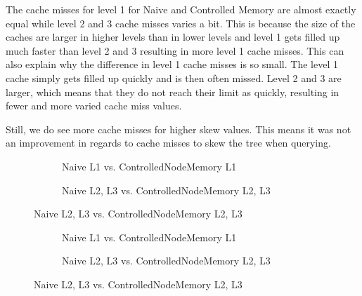 The cache misses for level 1 for Naive and Controlled Memory are almost exactly equal while level 2 and 3 cache misses varies a bit.
This is because the size of the caches are larger in higher levels than in lower levels and level 1 gets filled up much faster than level 2 and 3 resulting in more level 1 cache misses.
This can also explain why the difference in level 1 cache misses is so small. 
The level 1 cache simply gets filled up quickly and is then often missed. Level 2 and 3 are larger, which means that they do not reach their limit as quickly, resulting in fewer and more varied cache miss values.

Still, we do see more cache misses for higher skew values.
This means it was not an improvement in regards to cache misses to skew the tree when querying.

\begin{figure}
\caption{Rank Cache Misses on Wavelet Tree with increasing skew}
\label{fig:NaiveControlledNodeMemoryRankSkewCacheMisses}
\centering
\begin{subfigure}{\textwidth}
	\caption{Naive L1 vs. ControlledNodeMemory L1}
	\label{fig:L1NaiveControlledNodeMemoryRankSkewCacheMisses}
	
	\vspace*{5 mm}
\end{subfigure}
\begin{subfigure}{\textwidth}
	\caption{Naive L2, L3 vs. ControlledNodeMemory L2, L3}
	\label{fig:L2L3NaiveControlledNodeMemoryRankSkewCacheMisses}
 	
\end{subfigure}
\end{figure}

\begin{figure}
\caption{Select Cache Misses on Wavelet Tree with increasing skew}
\label{fig:NaiveControlledNodeMemorySelectSkewCacheMisses}
\centering
\begin{subfigure}{\textwidth}
	\caption{Naive L1 vs. ControlledNodeMemory L1}
	\label{fig:L1NaiveControlledNodeMemorySelectSkewCacheMisses}
	
	\vspace*{5 mm}
\end{subfigure}
\begin{subfigure}{\textwidth}
	\caption{Naive L2, L3 vs. ControlledNodeMemory L2, L3}
	\label{fig:L2L3NaiveControlledNodeMemorySelectSkewCacheMisses}
 	
\end{subfigure}
\end{figure}


